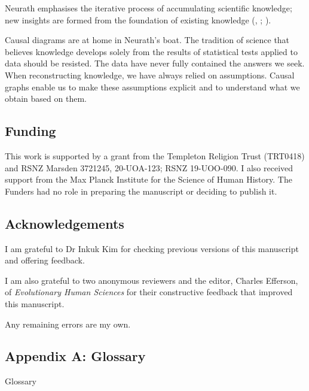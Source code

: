 \documentclass[
  single column]{article}
\begin{document}
Neurath emphasises the iterative process of accumulating scientific
knowledge; new insights are formed from the foundation of existing
knowledge (,
;
).

Causal diagrams are at home in Neurath's boat. The tradition of science
that believes knowledge develops solely from the results of statistical
tests applied to data should be resisted. The data have never fully
contained the answers we seek. When reconstructing knowledge, we have
always relied on assumptions. Causal graphs enable us to make these
assumptions explicit and to understand what we obtain based on them.

\newpage{}

\subsection{Funding}\label{funding}

This work is supported by a grant from the Templeton Religion Trust
(TRT0418) and RSNZ Marsden 3721245, 20-UOA-123; RSNZ 19-UOO-090. I also
received support from the Max Planck Institute for the Science of Human
History. The Funders had no role in preparing the manuscript or deciding
to publish it.

\subsection{Acknowledgements}\label{acknowledgements}

I am grateful to Dr Inkuk Kim for checking previous versions of this
manuscript and offering feedback.

I am also grateful to two anonymous reviewers and the editor, Charles
Efferson, of \emph{Evolutionary Human Sciences} for their constructive
feedback that improved this manuscript.

Any remaining errors are my own.

\newpage{}

\subsection{Appendix A: Glossary}\label{id-app-a}

\begin{table}

\caption{\label{tbl-experiments}Glossary}

\centering{

\glossaryTerms

}

\end{table}%
\end{document}
